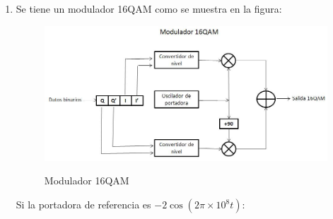 \begin{enumerate}
\begin{enumerate}
\begin{enumerate}
		
	\end{enumerate}

\item Se tiene un modulador 16QAM como se muestra en la figura:



\begin{figure}[h!]
	\captionsetup{justification = raggedright, singlelinecheck = false}
	\caption{Modulador 16QAM } 
	\centering
	\includegraphics[scale=0.50]{Imagenes/16qam.jpg}
	\label{fig:16qam}
\end{figure}


Si la portadora de referencia es $-2\cos(2\pi\times 10^8 t)$:



\end{enumerate}
\end{enumerate}
